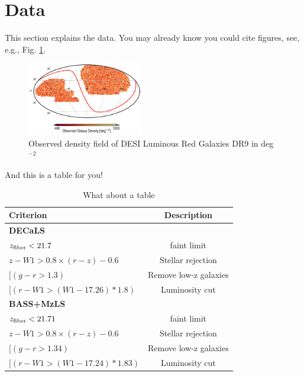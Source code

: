 \section{Data}
\label{sec:data}
This section explains the data. You may already know you could cite figures, see, e.g., Fig. \ref{fig:ng}.
\begin{figure}
    \centering
    \includegraphics[width=0.45\textwidth]{figures/nlrg.pdf}
    \caption{Observed density field of DESI Luminous Red Galaxies DR9 in deg$^{-2}$}
    \label{fig:ng}
\end{figure}

And this is a table for you!
\begin{table}
  \begin{center}
    \caption{What about a table}
    \label{tab:ts}
    \begin{tabular}{lc}
    \hline
      \textbf{Criterion} &\textbf{Description}\\
      \hline   
     \textbf{DECaLS} & \\ 
     $z_{\rm fiber} < 21.7$  & faint limit  \\
     $z - W1 > 0.8 \times (r - z) - 0.6$ & Stellar rejection  \\
     $[(g-r >1.3)$ & Remove low-z galaxies \\
     $[(r-W1 > (W1 - 17.26)*1.8)$ & Luminosity cut \\ 
    \hline
     \textbf{BASS+MzLS} & \\ 
     $z_{\rm fiber} < 21.71$  & faint limit  \\
     $z - W1 > 0.8 \times (r - z) - 0.6$ & Stellar rejection  \\
     $[(g-r >1.34)$ & Remove low-z galaxies \\
     $[(r-W1 > (W1 - 17.24)*1.83)$ & Luminosity cut \\ 
      \hline
      \end{tabular}
  \end{center}
\end{table}